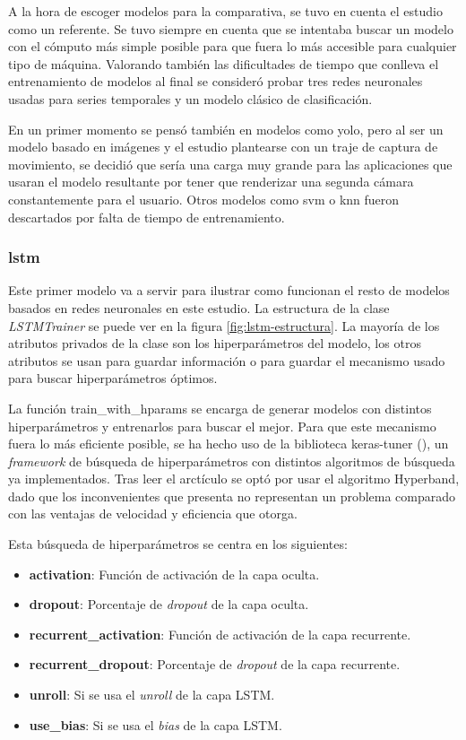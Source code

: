 A la hora de escoger modelos para la comparativa, se tuvo en cuenta el estudio \cite{combining3dskeleton} como un referente. Se tuvo siempre en cuenta que se intentaba buscar un modelo con el cómputo más simple posible para que fuera lo más accesible para cualquier tipo de máquina. Valorando también las dificultades de tiempo que conlleva el entrenamiento de modelos al final se consideró probar tres redes neuronales usadas para series temporales y un modelo clásico de clasificación.

En un primer momento se pensó también en modelos como \gls{yolo}, pero al ser un modelo basado en imágenes y el estudio plantearse con un traje de captura de movimiento, se decidió que sería una carga muy grande para las aplicaciones que usaran el modelo resultante por tener que renderizar una segunda cámara constantemente para el usuario. Otros modelos como \gls{svm} o \gls{knn} fueron descartados por falta de tiempo de entrenamiento.
\subsubsection{\gls{lstm}}

Este primer modelo va a servir para ilustrar como funcionan el resto de modelos basados en redes neuronales en este estudio. La estructura de la clase \textit{LSTMTrainer} se puede ver en la figura \ref{fig:lstm-estructura}. La mayoría de los atributos privados de la clase son los hiperparámetros del modelo, los otros atributos se usan para guardar información o para guardar el mecanismo usado para buscar hiperparámetros óptimos.

La función train\_with\_hparams se encarga de generar modelos con distintos hiperparámetros y entrenarlos para buscar el mejor. Para que este mecanismo fuera lo más eficiente posible, se ha hecho uso de la biblioteca keras-tuner (\cite{omalley2019kerastuner}), un \textit{framework} de búsqueda de hiperparámetros con distintos algoritmos de búsqueda ya implementados. Tras leer el arctículo \cite{li2018hyperbandnovelbanditbasedapproach} se optó por usar el algoritmo Hyperband, dado que los inconvenientes que presenta no representan un problema comparado con las ventajas de velocidad y eficiencia que otorga.

Esta búsqueda de hiperparámetros se centra en los siguientes:
\begin{itemize}
    \item \textbf{activation}: Función de activación de la capa oculta.
    \item \textbf{dropout}: Porcentaje de \textit{dropout} de la capa oculta.
    \item \textbf{recurrent\_activation}: Función de activación de la capa recurrente.
    \item \textbf{recurrent\_dropout}: Porcentaje de \textit{dropout} de la capa recurrente.
    \item \textbf{unroll}: Si se usa el \textit{unroll} de la capa LSTM.
    \item \textbf{use\_bias}: Si se usa el \textit{bias} de la capa LSTM.
\end{itemize}

